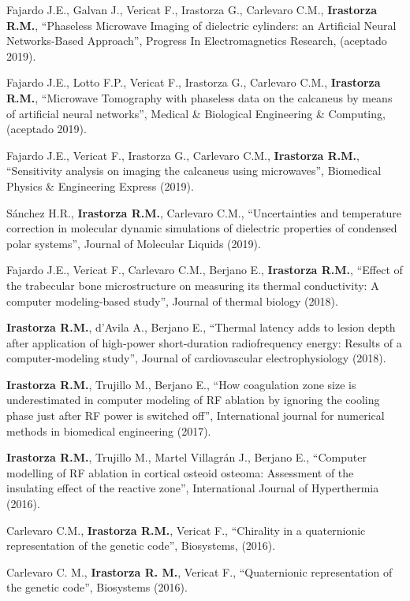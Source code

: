 \documentclass[margin,line]{res}
\begin{document}
\begin{resume}
Fajardo J.E., Galvan J., Vericat F., Irastorza G., Carlevaro C.M., \textbf{Irastorza R.M.}, ``Phaseless Microwave Imaging of dielectric cylinders: an Artificial Neural Networks-Based Approach'', Progress In Electromagnetics Research, (aceptado 2019). 

Fajardo J.E., Lotto F.P., Vericat F., Irastorza G., Carlevaro C.M., \textbf{Irastorza R.M.}, ``Microwave Tomography with phaseless data on the calcaneus by means of artificial neural networks'', Medical \& Biological Engineering \& Computing, (aceptado 2019).

Fajardo J.E., Vericat F., Irastorza G., Carlevaro C.M., \textbf{Irastorza R.M.}, ``Sensitivity analysis on imaging the calcaneus using microwaves'', Biomedical Physics \& Engineering Express (2019).

Sánchez H.R., {\bf Irastorza R.M.}, Carlevaro C.M., ``Uncertainties and temperature correction in molecular dynamic simulations of dielectric properties of condensed polar systems'', Journal of Molecular Liquids (2019).

Fajardo J.E., Vericat F., Carlevaro C.M., Berjano E., \textbf{Irastorza R.M.}, ``Effect of the trabecular bone microstructure on measuring its thermal conductivity: A computer modeling-based study'', Journal of thermal biology (2018).

\textbf{Irastorza R.M.}, d'Avila A., Berjano E., ``Thermal latency adds to lesion depth after application of high‐power short‐duration radiofrequency energy: Results of a computer‐modeling study'', Journal of cardiovascular electrophysiology (2018).

\textbf{Irastorza R.M.}, Trujillo M., Berjano E., ``How coagulation zone size is underestimated in computer modeling of RF ablation by ignoring the cooling phase just after RF power is switched off'', International journal for numerical methods in biomedical engineering (2017).

\textbf{Irastorza R.M.}, Trujillo M., Martel Villagrán J., Berjano E., ``Computer modelling of RF ablation in cortical osteoid osteoma: Assessment of the insulating effect of the reactive zone'', International Journal of Hyperthermia (2016).

Carlevaro C.M., {\bf Irastorza R.M.}, Vericat F., ``Chirality in a quaternionic representation of the genetic code'', Biosystems, (2016).

Carlevaro C. M., \textbf{Irastorza R. M.}, Vericat F., ``Quaternionic representation of the genetic code'', Biosystems (2016).


\end{resume}
\end{document}
